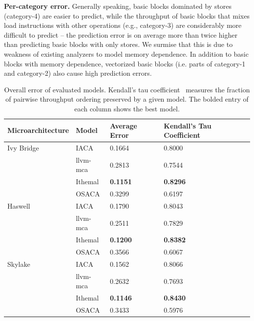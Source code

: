 \textbf{Per-category error.} Generally speaking, basic blocks dominated by stores
(category-4) are easier to predict,
while the throughput of basic blocks that mixes load instructions
with other operations (e.g., category-3) are considerably
more difficult to predict -- the prediction error is on average more than
twice higher than predicting basic blocks with only stores. 
We surmise that this is due to weakness of existing analyzers to model 
memory dependence.
In addition to basic blocks with memory dependence,
vectorized basic blocks (i.e. parts of category-1 and category-2) also cause high prediction errors.
\fi



\begin{table}
\begin{tabular}
{|p{}|p{}|p{}|p{}|}
\hline

\textbf{Microarchitecture} & \textbf{Model} &
\textbf{Average Error} & \textbf{Kendall's Tau Coefficient} \\
\hline

Ivy Bridge & IACA & 0.1664 & 0.8000\\
    & llvm-mca & 0.2813 & 0.7544\\
    & Ithemal & \textbf{0.1151} & \textbf{0.8296}\\
    & OSACA & 0.3299 & 0.6197\\
\hline

Haswell & IACA & 0.1790 & 0.8043\\
    & llvm-mca & 0.2511 & 0.7829\\
    & Ithemal & \textbf{0.1200} & \textbf{0.8382}\\
    & OSACA & 0.3566 & 0.6067\\
    
\hline 
Skylake & IACA & 0.1562 & 0.8066\\
    & llvm-mca & 0.2632 & 0.7693\\
    & Ithemal & \textbf{0.1146} & \textbf{0.8430}\\
    & OSACA & 0.3433 & 0.5976\\

\hline
\end{tabular}
\\
\caption{Overall error of evaluated models. Kendall's tau coefficient~\cite{kendalltau}
measures the fraction of pairwise throughput ordering preserved by a given model.
The bolded entry of each column shows the best model.}
\label{tab:overall}
\end{table}

